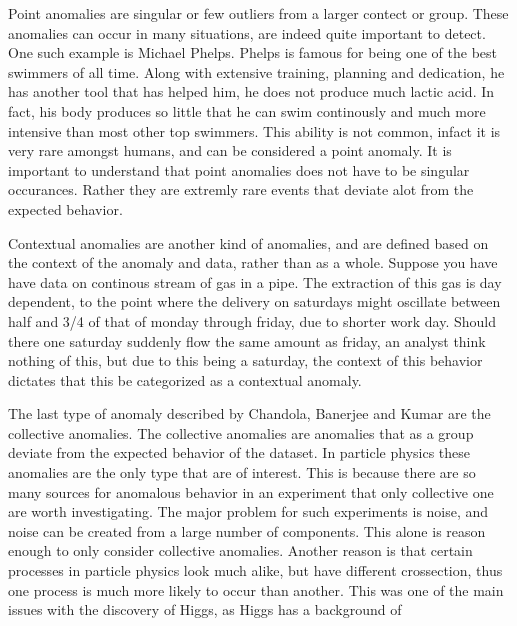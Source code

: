 Point anomalies are singular or few outliers from a larger contect or group. These anomalies can occur in many situations, are 
indeed quite important to detect. One such example is Michael Phelps. Phelps is famous for being one of the best swimmers of all time. 
Along with extensive training, planning and dedication, he has another tool that has helped him, he does not produce much lactic acid. 
In fact, his body produces so little that he can swim continously and much more intensive than most other top swimmers. This ability 
is not common, infact it is very rare amongst humans, and can be considered a point anomaly. It is important to understand that point anomalies
does not have to be singular occurances. Rather they are extremly rare events that deviate alot from the expected behavior. \par
Contextual anomalies are another kind of anomalies, and are defined based on the context of the anomaly and data, rather than as a whole. 
Suppose you have have data on continous stream of gas in a pipe. The extraction of this gas is day dependent, to the point where the delivery 
on saturdays might oscillate between half and 3/4 of that of monday through friday, due to shorter work day. Should there one saturday 
suddenly flow the same amount as friday, an analyst think nothing of this, but due to this being a saturday, the context of this behavior 
dictates that this be categorized as a contextual anomaly. \par 
The last type of anomaly described by Chandola, Banerjee and Kumar \cite{anom_detec} are the collective anomalies. The collective anomalies 
are anomalies that as a group deviate from the expected behavior of the dataset. In particle physics these anomalies are the only type that 
are of interest. This is because there are so many sources for anomalous behavior in an experiment that only collective one are worth investigating. 
The major problem for such experiments is noise, and noise can be created from a large number of components. This alone is reason enough to 
only consider collective anomalies. Another reason is that certain processes in particle physics look much alike, but have different crossection,
thus one process is much more likely to occur than another. This was one of the main issues with the discovery of Higgs, as Higgs has a background 
of 